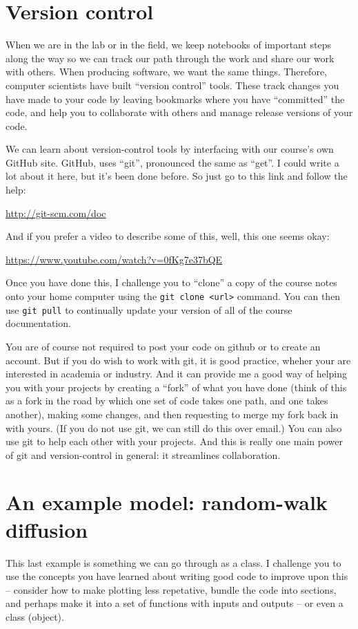 \documentclass[a4paper,10pt]{scrartcl}
\begin{document}
\section{Version control}

When we are in the lab or in the field, we keep notebooks of important steps along the way so we can track our path through the work and share our work with others. When producing software, we want the same things. Therefore, computer scientists have built ``version control'' tools. These track changes you have made to your code by leaving bookmarks where you have ``committed'' the code, and help you to collaborate with others and manage release versions of your code.

We can learn about version-control tools by interfacing with our course's own GitHub site. GitHub, uses ``git'', pronounced the same as ``get''. I could write a lot about it here, but it's been done before. So just go to this link and follow the help:

\url{http://git-scm.com/doc}

And if you prefer a video to describe some of this, well, this one seems okay:

\url{https://www.youtube.com/watch?v=0fKg7e37bQE}

Once you have done this, I challenge you to ``clone'' a copy of the course notes onto your home computer using the \lstinline{git clone <url>} command. You can then use \lstinline{git pull} to continually update your version of all of the course documentation.

You are of course not required to post your code on github or to create an account. But if you do wish to work with git, it is good practice, wheher your are interested in academia or industry. And it can provide me a good way of helping you with your projects by creating a ``fork'' of what you have done (think of this as a fork in the road by which one set of code takes one path, and one takes another), making some changes, and then requesting to merge my fork back in with yours. (If you do not use git, we can still do this over email.) You can also use git to help each other with your projects. And this is really one main power of git and version-control in general: it streamlines collaboration.

\section{An example model: random-walk diffusion}

This last example is something we can go through as a class. I challenge you to use the concepts you have learned about writing good code to improve upon this -- consider how to make plotting less repetative, bundle the code into sections, and perhaps make it into a set of functions with inputs and outputs -- or even a class (object).


\end{document}
